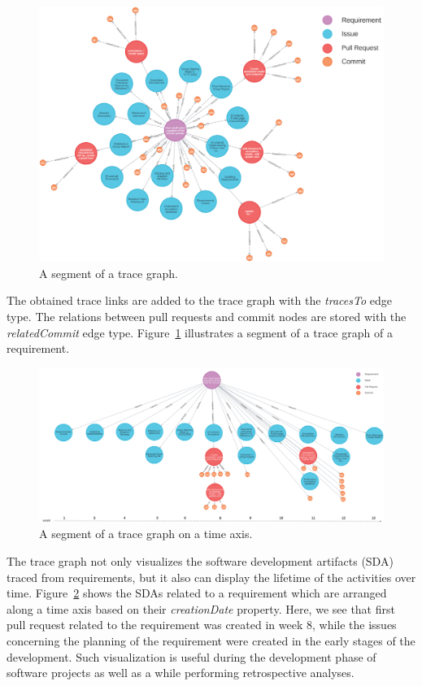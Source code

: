 \begin{figure}[htb]
    \centering
    \includegraphics[width=1\linewidth]{figs/rawTraceGraph.png}
    \caption{A segment of a trace graph.}
    \label{fig:rawtracegraph}
  \end{figure}

  The obtained trace links are added to the trace graph with the \emph{tracesTo} edge type. 
  The relations between pull requests and commit nodes are stored with the \emph{relatedCommit} edge type.
  Figure~\ref{fig:rawtracegraph} illustrates a segment of a trace graph of a requirement.

\begin{figure}[htb]
    \centering
    \includegraphics[width=.99\linewidth]{figs/traceGraph.png}
    \caption{A segment of a trace graph on a time axis.}
    \label{fig:tracegraph}
\end{figure}

The trace graph  not only visualizes the software development artifacts (SDA)  traced from requirements, but it also can display the lifetime of the activities over time. 
Figure~\ref{fig:tracegraph} shows the SDAs related to a requirement which are arranged along a time axis based on their \textit{creationDate} property. 
Here, we see that first pull request related to the requirement was created in week 8, while the issues concerning the planning of the requirement were created in the early stages of the development. 
Such visualization is useful during the development phase of software projects as well as a while performing retrospective analyses.





